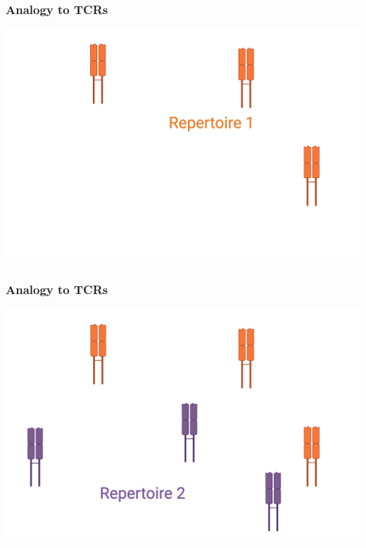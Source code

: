\documentclass[mathserif,compress,xcolor={dvipsnames}]{beamer}
\renewcommand\;{\,}
\begin{document}
\begin{frame}\frametitle{Analogy to TCRs}
\begin{center}
\includegraphics[width=\linewidth]{Images/TCR_soldier_rep_1.png}
\end{center}
\end{frame}

\begin{frame}\frametitle{Analogy to TCRs}
\begin{center}
\includegraphics[width=\linewidth]{Images/TCR_soldier_rep_2.png}
\end{center}
\end{frame}
\end{document}
